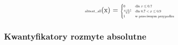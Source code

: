 \documentclass{article}
\begin{document}
\begin{equation*}
\begin{minipage}{0.5\textwidth}
\centering
\text{\scalebox{0.5}{almost\_all}}(x) = \scalebox{0.5}{$
\begin{cases}
0 & \text{dla } x \leq 0.7 \\
\frac{x - 0.7}{0.2} & \text{dla } 0.7 < x \leq 0.9 \\
1 & \text{w przeciwnym przypadku}
\end{cases}
$}
\end{minipage}
\end{equation*}

\subsubsection{Kwantyfikatory rozmyte absolutne}
\end{document}
